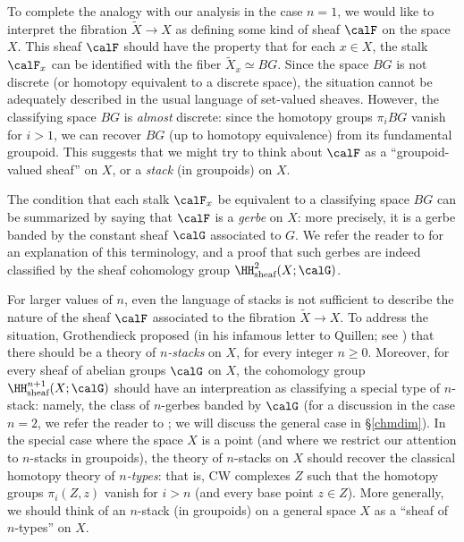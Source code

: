 To complete the analogy with our analysis in the case $n=1$, we would like to interpret
the fibration $\widetilde{X} \rightarrow X$ as defining some kind of sheaf $\calF$ on the space $X$.
This sheaf $\calF$ should have the property that for each $x \in X$, the stalk
$\calF_x$ can be identified with the fiber $\widetilde{X}_x \simeq BG$. Since the space $BG$ is not discrete (or homotopy equivalent to a discrete space), the situation cannot be adequately described in the usual language of set-valued sheaves. However, the classifying space $BG$ is 
{\em almost} discrete: since the homotopy groups $\pi_i BG$ vanish for $i > 1$, we
can recover $BG$ (up to homotopy equivalence) from its fundamental groupoid.
This suggests that we might try to think about $\calF$ as a ``groupoid-valued sheaf'' on $X$,
or a {\it stack} (in groupoids) on $X$.

\begin{remark2}
The condition that each stalk $\calF_x$ be equivalent to a classifying space $BG$
can be summarized by saying that $\calF$ is a {\it gerbe} on $X$: more precisely, it is a
gerbe banded by the constant sheaf $\calG$ associated to $G$.
We refer the reader to \cite{giraud} for an explanation of this terminology, and a proof that
such gerbes are indeed classified by the sheaf cohomology group $\HH^{2}_{\text{sheaf}}(X;\calG)$. 
\end{remark2}

For larger values of $n$, even the language of stacks is not sufficient to describe the nature of the sheaf $\calF$ associated to the fibration $\widetilde{X} \rightarrow X$. To address the situation,
Grothendieck proposed (in his infamous letter to Quillen; see \cite{pursuing}) that there
should be a theory of {\it $n$-stacks} on $X$, for every integer $n \geq 0$. Moreover, for every sheaf of abelian groups $\calG$ on $X$, the cohomology group
$\HH^{n+1}_{\text{sheaf}}(X;\calG)$ should have an interpreation as classifying a special type
of $n$-stack: namely, the class of $n$-gerbes banded by $\calG$ (for a discussion in the case $n=2$, we refer the reader to \cite{breen}; we will discuss the general case in \S \ref{chmdim}).
In the special case where the space $X$ is a point (and where we restrict our attention to
$n$-stacks in groupoids), the theory of $n$-stacks on $X$ should recover the classical homotopy theory of {\it $n$-types}: that is, CW complexes $Z$ such that the homotopy groups
$\pi_{i}(Z,z)$ vanish for $i > n$ (and every base point $z \in Z$). More generally, we should think of an $n$-stack (in groupoids) on a general space $X$ as a ``sheaf of $n$-types'' on $X$. 

